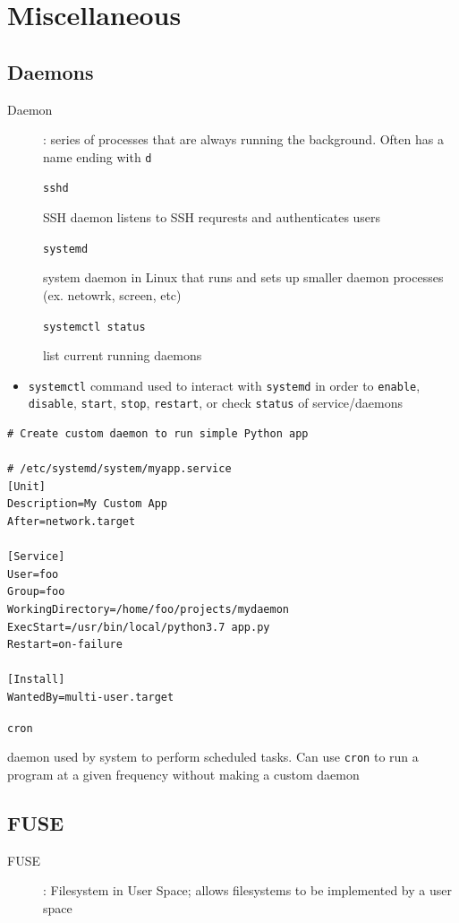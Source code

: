 \documentclass[letterpaper,12pt]{article}
\newcommand*{\lstitem}[1]{
  \setbox0\hbox{\lstinline{#1}}
  \item[\usebox0]
}
\begin{document}
\section{Miscellaneous}

\subsection{Daemons}
\begin{description}
 \item[Daemon]: series of processes that are always running the background. Often has a name ending with \lstinline{d}
       \lstitem{sshd} SSH daemon listens to SSH requrests and authenticates users
       \lstitem{systemd} system daemon in Linux that runs and sets up smaller daemon processes (ex. netowrk, screen, etc)
       \lstitem{systemctl status} list current running daemons
\end{description}

\begin{itemize}
 \item \lstinline{systemctl} command used to interact with \lstinline{systemd} in order to \lstinline{enable}, \lstinline{disable}, \lstinline{start}, \lstinline{stop}, \lstinline{restart}, or check \lstinline{status} of service/daemons
\end{itemize}

\begin{lstlisting}
# Create custom daemon to run simple Python app

# /etc/systemd/system/myapp.service
[Unit]
Description=My Custom App
After=network.target

[Service]
User=foo
Group=foo
WorkingDirectory=/home/foo/projects/mydaemon
ExecStart=/usr/bin/local/python3.7 app.py
Restart=on-failure

[Install]
WantedBy=multi-user.target
\end{lstlisting}

\begin{description}
 \lstitem{cron} daemon used by system to perform scheduled tasks. Can use \lstinline{cron} to run a program at a given frequency without making a custom daemon
\end{description}

\subsection{FUSE}
\begin{description}
 \item[FUSE]: Filesystem in User Space; allows filesystems to be implemented by a user space
\end{description}
\end{document}
